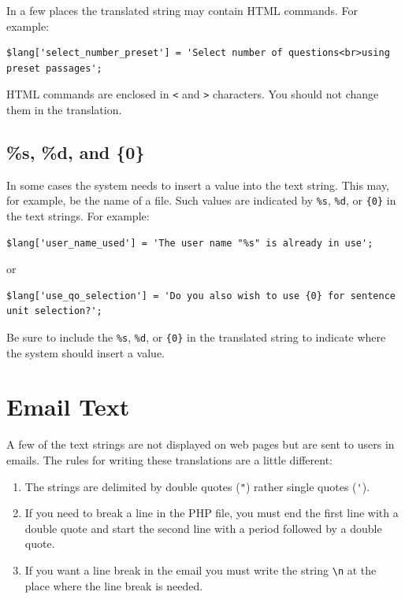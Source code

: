 \documentclass[11pt,oneside,a4paper]{memoir}
\begin{document}
In a few places the translated string may contain HTML commands. For example:

\begin{lstlisting}
$lang['select_number_preset'] = 'Select number of questions<br>using preset passages';
\end{lstlisting}

HTML commands are enclosed in \verb|<| and \verb|>| characters. You should not change them in the
translation.

\subsection{\%s, \%d, and \{0\}}

In some cases the system needs to insert a value into the text string. This may, for example, be the
name of a file. Such values are indicated by \verb|%s|, \verb|%d|, or \verb|{0}| in the text
strings. For example:

\begin{lstlisting}
$lang['user_name_used'] = 'The user name "%s" is already in use';
\end{lstlisting}

or
\begin{lstlisting}
$lang['use_qo_selection'] = 'Do you also wish to use {0} for sentence unit selection?';
\end{lstlisting}

Be sure to include the \verb|%s|, \verb|%d|, or \verb|{0}| in the translated string to indicate
where the system should insert a value.

\section{Email Text}\label{sec-email-text}

A few of the text strings are not displayed on web pages but are sent to users in emails. The rules
for writing these translations are a little different:

\begin{enumerate}
\item The strings are delimited by double quotes (\verb|"|) rather single quotes (\verb|'|).
\item If you need to break a line in the PHP file, you must end the first line with a double quote
  and start the second line with a period followed by a double quote.
\item If you want a line break in the email you must write the string \verb|\n| at the place where
  the line break is needed.
\end{enumerate}
\end{document}
